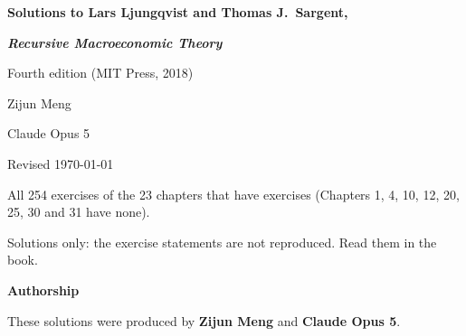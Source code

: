 \documentclass[11pt,letterpaper,reqno]{amsart}
\begin{document}
\begin{titlepage}
\centering
\vspace*{0.2\textheight}
{\LARGE\bfseries Solutions to Lars Ljungqvist and Thomas J.\ Sargent,\par}
\vspace{1.2ex}
{\LARGE\bfseries\itshape Recursive Macroeconomic Theory\par}
\vspace{1.2ex}
{\large Fourth edition (MIT Press, 2018)\par}
\vspace{4em}
{\Large Zijun Meng\par}
\vspace{1ex}
{\Large Claude Opus 5\par}
\vspace{4em}
{\large Revised \today\par}
\vfill
{\small All 254 exercises of the 23 chapters that have exercises (Chapters 1, 4, 10, 12, 20, 25, 30 and 31 have none).\par}
\vspace{0.8ex}
{\small Solutions only: the exercise statements are not reproduced.  Read them in the book.\par}
\end{titlepage}

\thispagestyle{plain}
\begin{center}{\large\bfseries Authorship\par}\end{center}
\vspace{1ex}
\noindent These solutions were produced by \textbf{Zijun Meng} and
\textbf{Claude Opus 5}.

\clearpage
\end{document}
